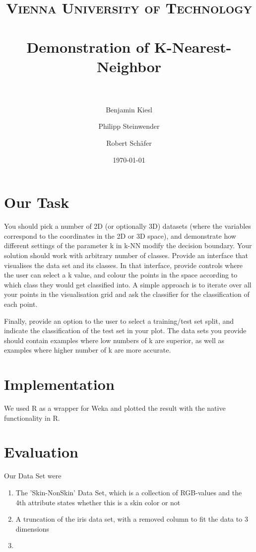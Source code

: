 \documentclass[paper=a4, fontsize=11pt]{scrartcl} %
\title{	
\normalfont \normalsize 
\textsc{Vienna University of Technology} \\ [25pt] %
\horrule{0.5pt} \\[0.4cm] %
\huge Demonstration of K-Nearest-Neighbor \\ %
\horrule{2pt} \\[0.5cm] %
}
\author{Benjamin Kiesl \and Philipp Steinwender \and Robert Schäfer} %
\date{\normalsize\today} %
\numberwithin{equation}{section} %
\numberwithin{figure}{section} %
\numberwithin{table}{section} %
\begin{document}
\maketitle %


\section{Our Task}

You should pick a number of 2D (or optionally 3D) datasets (where the variables correspond to the coordinates in the 2D or 3D space), and demonstrate how different settings of the parameter k in k-NN modify the decision boundary. Your solution should work with arbitrary number of classes.
Provide an interface that visualises the data set and its classes. In that interface, provide controls where the user can select a k value, and colour the points in the space according to which class they would get classified into. A simple approach is to iterate over all your points in the visualisation grid and ask the classifier for the classification of each point.

Finally, provide an option to the user to select a training/test set split, and indicate the classification of the test set in your plot.
The data sets you provide should contain examples where low numbers of k are superior, as well as examples where higher number of k are more accurate.

\section{Implementation}

We used R as a wrapper for Weka and plotted the result with the native functionality in R.

\section{Evaluation}
Our Data Set were 
\begin{enumerate}
\item
The 'Skin-NonSkin' Data Set, which is a collection of RGB-values and the 4th attribute states whether this is a skin color or not
\item
A truncation of the iris data set, with a removed column to fit the data to 3 dimensions
\item
{}
\end{enumerate}
\end{document}

